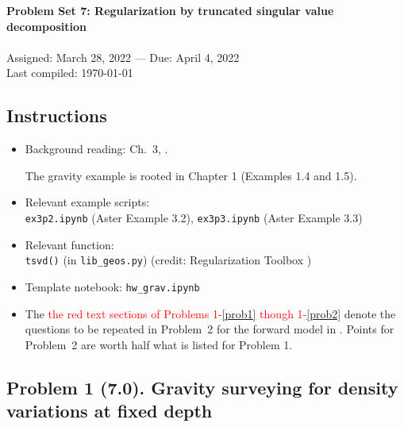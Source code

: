\documentclass[11pt,titlepage,fleqn]{article}
\newcommand{\tfile}{{\tt hw\_grav.ipynb}}
\begin{document}

\begin{spacing}{1.2}
\centering
{\large \bf Problem Set 7: Regularization by truncated singular value decomposition} \\
\cltag\ \\
Assigned: March 28, 2022 --- Due: April 4, 2022 \\
Last compiled: \today
\end{spacing}


\subsection*{Instructions}

\begin{itemize}
\item Background reading: Ch.~3, \citet{Aster}.

The gravity example is rooted in Chapter 1 (Examples 1.4 and 1.5).

\item Relevant example scripts: \\ \verb+ex3p2.ipynb+ (Aster Example 3.2), \verb+ex3p3.ipynb+ (Aster Example 3.3)
\item Relevant function: \\ \verb+tsvd()+ (in \verb+lib_geos.py+) (credit: Regularization Toolbox \citep{Hansen})
\item Template notebook: \tfile\
\item The \textcolor{red}{the red text sections of Problems 1-\ref{prob1} though 1-\ref{prob2}} denote the questions to be repeated in Problem~2 for the forward model in . Points for Problem~2 are worth half what is listed for Problem 1.
\end{itemize}


\subsection*{Problem 1 (7.0). Gravity surveying for density variations at fixed depth}
\end{document}
